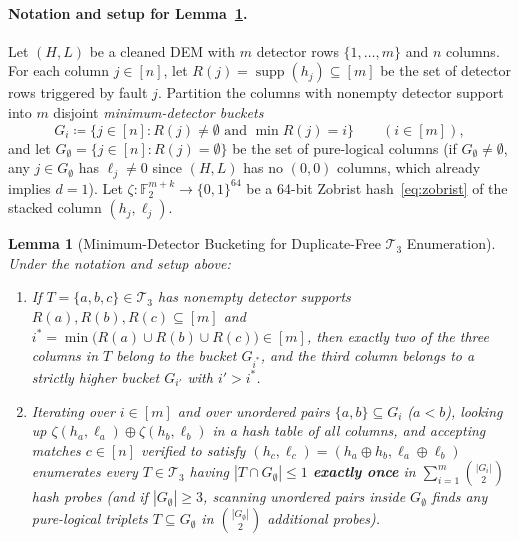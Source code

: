 \documentclass[12pt]{article}
\newtheorem{lemma}{Lemma}
\theoremstyle{definition}
\newcommand{\Ftwo}{\mathbb{F}_2}
\DeclareMathOperator{\supp}{supp}
\newcommand{\Tc}{\mathcal{T}_3}
\begin{document}
\paragraph{Notation and setup for Lemma~\ref{lem:min_det_bucket}.}
Let $(H, L)$ be a cleaned DEM with $m$ detector rows $\{1, \dots, m\}$ and $n$ columns. For each column $j \in
[n]$, let $R(j) = \supp(h_j) \subseteq [m]$ be the set of detector rows triggered by fault $j$. Partition the
columns with nonempty detector support into $m$ disjoint \emph{minimum-detector buckets}
\begin{equation}\label{eq:Gr_buckets}
  G_i \coloneqq \bigl\{j \in [n] : R(j) \neq \emptyset \text{ and } \min R(j) = i\bigr\} \qquad (i \in [m]),
\end{equation}
and let $G_\emptyset = \{j \in [n] : R(j) = \emptyset\}$ be the set of pure-logical columns (if $G_\emptyset \neq
\emptyset$, any $j \in G_\emptyset$ has $\ell_j \neq 0$ since $(H, L)$ has no $(0, 0)$ columns, which already
implies $d = 1$). Let $\zeta : \Ftwo^{m+k} \to \{0, 1\}^{64}$ be a 64-bit Zobrist hash~\eqref{eq:zobrist} of the
stacked column $(h_j, \ell_j)$.

\begin{lemma}[Minimum-Detector Bucketing for Duplicate-Free $\Tc$ Enumeration]\label{lem:min_det_bucket}
Under the notation and setup above:
\begin{enumerate}[label=(\alph*)]
  \item If $T = \{a, b, c\} \in \Tc$ has nonempty detector supports $R(a), R(b), R(c) \subseteq [m]$ and
    $i^* = \min\bigl(R(a) \cup R(b) \cup R(c)\bigr) \in [m]$, then exactly two of the three columns in $T$ belong to
    the bucket $G_{i^*}$, and the third column belongs to a strictly higher bucket $G_{i'}$ with $i' > i^*$.
  \item Iterating over $i \in [m]$ and over unordered pairs $\{a, b\} \subseteq G_i$ ($a < b$), looking up
    $\zeta(h_a, \ell_a) \oplus \zeta(h_b, \ell_b)$ in a hash table of all columns, and accepting matches $c \in
    [n]$ verified to satisfy $(h_c, \ell_c) = (h_a \oplus h_b, \ell_a \oplus \ell_b)$ enumerates every $T \in \Tc$
    having $|T \cap G_\emptyset| \le 1$ \textbf{exactly once} in $\sum_{i=1}^m \binom{|G_i|}{2}$ hash probes (and
    if $|G_\emptyset| \ge 3$, scanning unordered pairs inside $G_\emptyset$ finds any pure-logical triplets $T
    \subseteq G_\emptyset$ in $\binom{|G_\emptyset|}{2}$ additional probes).
\end{enumerate}
\end{lemma}
\end{document}
